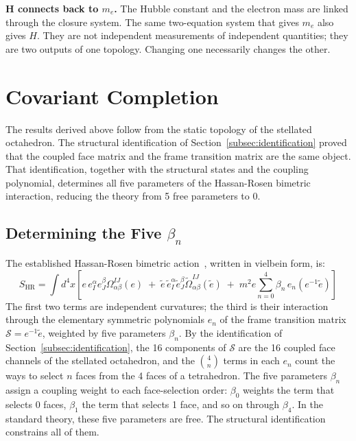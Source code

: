 \documentclass[aps,prd,preprint,superscriptaddress,showpacs,preprintnumbers,amsmath,amssymb,nofootinbib]{revtex4-2}
\begin{document}
\textbf{H connects back to $m_e$.} The Hubble constant and the electron mass are linked through the closure system. The same two-equation system that gives $m_e$ also gives $H$. They are not independent measurements of independent quantities; they are two outputs of one topology. Changing one necessarily changes the other.

\section{Covariant Completion}
\label{sec:covariant}

The results derived above follow from the static topology of the stellated octahedron. The structural identification of Section~\ref{subsec:identification} proved that the coupled face matrix and the frame transition matrix are the same object. That identification, together with the structural states and the coupling polynomial, determines all five parameters of the Hassan-Rosen bimetric interaction, reducing the theory from 5 free parameters to 0.

\subsection{Determining the Five $\beta_n$}
\label{subsec:beta}

The established Hassan-Rosen bimetric action~\cite{hassan2012}, written in vielbein form, is:
\begin{equation}
S_{\text{HR}} = \int d^4x \left[ e\, e_I^\alpha e_J^\beta \Omega^{IJ}_{\alpha\beta}(e) \;+\; \tilde{e}\, \tilde{e}_I^\alpha \tilde{e}_J^\beta \tilde{\Omega}^{IJ}_{\alpha\beta}(\tilde{e}) \;+\; m^2 e \sum_{n=0}^{4} \beta_n \, e_n(e^{-1}\tilde{e}) \right]
\label{eq:hassan-rosen}
\end{equation}
The first two terms are independent curvatures; the third is their interaction through the elementary symmetric polynomials $e_n$ of the frame transition matrix $\mathcal{S} = e^{-1}\tilde{e}$, weighted by five parameters $\beta_n$. By the identification of Section~\ref{subsec:identification}, the 16 components of $\mathcal{S}$ are the 16 coupled face channels of the stellated octahedron, and the $\binom{4}{n}$ terms in each $e_n$ count the ways to select $n$ faces from the 4 faces of a tetrahedron. The five parameters $\beta_n$ assign a coupling weight to each face-selection order: $\beta_0$ weights the term that selects 0 faces, $\beta_1$ the term that selects 1 face, and so on through $\beta_4$. In the standard theory, these five parameters are free. The structural identification constrains all of them.
\end{document}
